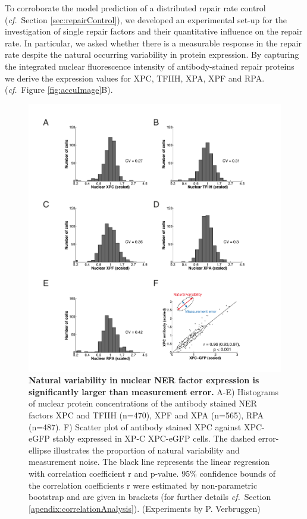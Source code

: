 To corroborate the model prediction of a distributed repair rate control (\textit{cf.}\ Section \ref{sec:repairControl}), we developed an experimental set-up for the investigation of single repair factors and their quantitative influence on the repair rate. In particular, we asked whether there is a measurable response in the repair rate despite the natural occurring variability in protein expression. By capturing the integrated nuclear fluorescence intensity of antibody-stained repair proteins we derive the expression values for XPC, TFIIH, XPA, XPF and RPA. (\textit{cf.}\ Figure \ref{fig:accuImage}B).
\begin{figure}[h!]
	\begin{center}
		\includegraphics[width=1\textwidth]{Abbildungen/figure3_2.pdf}
		\caption{\textbf{Natural variability in nuclear NER factor expression is significantly larger than measurement error.} A-E) Histograms of nuclear protein concentrations of the antibody stained NER factors XPC and TFIIH (n=470), XPF and XPA (n=565), RPA (n=487). F) Scatter plot of antibody stained XPC against XPC-eGFP stably expressed in XP-C XPC-eGFP cells. The dashed error-ellipse illustrates the proportion of natural variability and measurement noise. The black line represents the linear regression with correlation coefficient r and p-value. 95\% confidence bounds of the correlation coefficients r were estimated by non-parametric bootstrap and are given in brackets (for further details \textit{cf.}\ Section \ref{apendix:correlationAnalysis}). (Experiments by P. Verbruggen)}
		\label{fig:ProteinDist}
	\end{center}
\end{figure}


